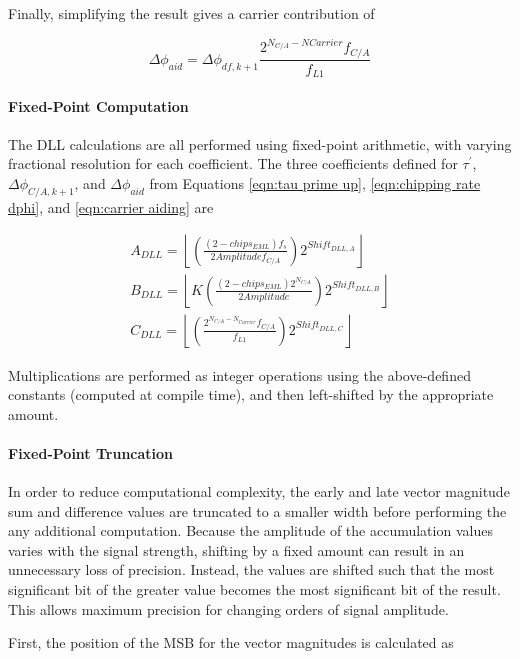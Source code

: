 \documentclass[12pt]{article}
\begin{document}
Finally, simplifying the result gives a carrier contribution of

\begin{equation}
\label{eqn:carrier aiding}
\Delta \phi_{aid} = \Delta\phi_{df,k+1} \frac{2^{N_{C/A}-N{Carrier}} f_{C/A}}{f_{L1}}
\end{equation}

\paragraph{Fixed-Point Computation}
\label{sec:fixed-point computation}
The DLL calculations are all performed using fixed-point arithmetic, with varying fractional resolution for each coefficient. The three coefficients defined for  $\tau^\prime$, $\Delta\phi_{C/A,k+1}$, and $\Delta\phi_{aid}$ from Equations \ref{eqn:tau prime up}, \ref{eqn:chipping rate dphi}, and \ref{eqn:carrier aiding} are

\begin{gather*}
A_{DLL} = \left\lfloor \left( \frac{(2-chips_{EML})f_s}{2 Amplitude f_{C/A}} \right) 2^{Shift_{DLL,A}} \right\rfloor \\
B_{DLL} = \left\lfloor K \left( \frac{(2-chips_{EML}) 2^{N_{C/A}}}{2 Amplitude} \right) 2^{Shift_{DLL,B}} \right\rfloor \\
C_{DLL} = \left\lfloor \left( \frac{2^{N_{C/A}-N_{Carrier}} f_{C/A}}{f_{L1}} \right) 2^{Shift_{DLL,C}} \right\rfloor
\end{gather*}

Multiplications are performed as integer operations using the above-defined constants (computed at compile time), and then left-shifted by the appropriate amount.

\paragraph{Fixed-Point Truncation}
\label{sec:fixed-point truncation}
In order to reduce computational complexity, the early and late vector magnitude sum and difference values are truncated to a smaller width before performing the any additional computation. Because the amplitude of the accumulation values varies with the signal strength, shifting by a fixed amount can result in an unnecessary loss of precision. Instead, the values are shifted such that the most significant bit of the greater value becomes the most significant bit of the result. This allows maximum precision for changing orders of signal amplitude.

First, the position of the MSB for the vector magnitudes is calculated as
\end{document}
